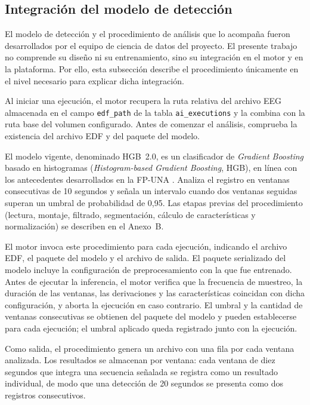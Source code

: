 \subsection{Integración del modelo de detección}
\label{subsec:modelo-vigente-hgb}

El modelo de detección y el procedimiento de análisis que lo acompaña fueron desarrollados por el equipo de ciencia de datos del proyecto.
El presente trabajo no comprende su diseño ni su entrenamiento, sino su integración en el motor y en la plataforma.
Por ello, esta subsección describe el procedimiento únicamente en el nivel necesario para explicar dicha integración.

Al iniciar una ejecución, el motor recupera la ruta relativa del archivo EEG almacenada en el campo \texttt{edf\_path} de la tabla \texttt{ai\_executions} y la combina con la ruta base del volumen configurado.
Antes de comenzar el análisis, comprueba la existencia del archivo EDF y del paquete del modelo.

\begin{nuevotextodos}
El modelo vigente, denominado HGB~2.0, es un clasificador de \textit{Gradient Boosting} basado en histogramas (\textit{Histogram-based Gradient Boosting}, HGB), en línea con los antecedentes desarrollados en la FP-UNA \citep{Lezcano2026GradientBoosting}.
Analiza el registro en ventanas consecutivas de 10 segundos y señala un intervalo cuando dos ventanas seguidas superan un umbral de probabilidad de 0,95.
Las etapas previas del procedimiento (lectura, montaje, filtrado, segmentación, cálculo de características y normalización) se describen en el Anexo~B.
\end{nuevotextodos}

El motor invoca este procedimiento para cada ejecución, indicando el archivo EDF, el paquete del modelo y el archivo de salida.
El paquete serializado del modelo incluye la configuración de preprocesamiento con la que fue entrenado.
Antes de ejecutar la inferencia, el motor verifica que la frecuencia de muestreo, la duración de las ventanas, las derivaciones y las características coincidan con dicha configuración, y aborta la ejecución en caso contrario.
El umbral y la cantidad de ventanas consecutivas se obtienen del paquete del modelo y pueden establecerse para cada ejecución; el umbral aplicado queda registrado junto con la ejecución.

Como salida, el procedimiento genera un archivo con una fila por cada ventana analizada.
Los resultados se almacenan por ventana: cada ventana de diez segundos que integra una secuencia señalada se registra como un resultado individual, de modo que una detección de 20 segundos se presenta como dos registros consecutivos.

